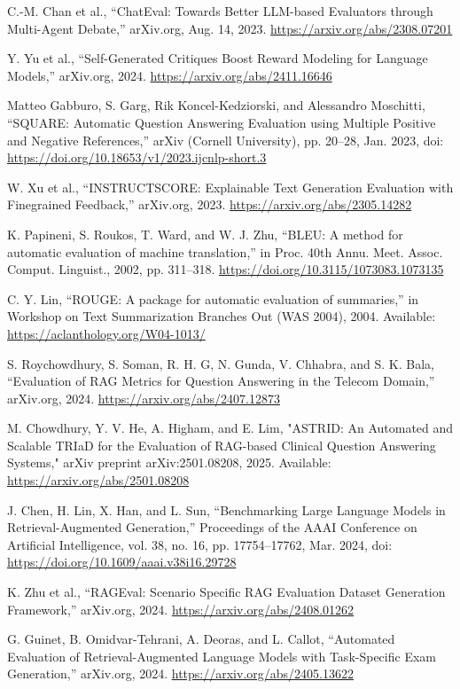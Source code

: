 \begin{thebibliography}{00}
 C.-M. Chan et al., “ChatEval: Towards Better LLM-based Evaluators through Multi-Agent Debate,” arXiv.org, Aug. 14, 2023. \url{https://arxiv.org/abs/2308.07201}

 Y. Yu et al., “Self-Generated Critiques Boost Reward Modeling for Language Models,” arXiv.org, 2024. \url{https://arxiv.org/abs/2411.16646}

 Matteo Gabburo, S. Garg, Rik Koncel-Kedziorski, and Alessandro Moschitti, “SQUARE: Automatic Question Answering Evaluation using Multiple Positive and Negative References,” arXiv (Cornell University), pp. 20–28, Jan. 2023, doi: \url{https://doi.org/10.18653/v1/2023.ijcnlp-short.3}

 W. Xu et al., “INSTRUCTSCORE: Explainable Text Generation Evaluation with Finegrained Feedback,” arXiv.org, 2023. \url{https://arxiv.org/abs/2305.14282}

 K. Papineni, S. Roukos, T. Ward, and W. J. Zhu, “BLEU: A method for automatic evaluation of machine translation,” in Proc. 40th Annu. Meet. Assoc. Comput. Linguist., 2002, pp. 311–318. \url{https://doi.org/10.3115/1073083.1073135}

 C. Y. Lin, “ROUGE: A package for automatic evaluation of summaries,” in Workshop on Text Summarization Branches Out (WAS 2004), 2004. Available: \url{https://aclanthology.org/W04-1013/}

 S. Roychowdhury, S. Soman, R. H. G, N. Gunda, V. Chhabra, and S. K. Bala, “Evaluation of RAG Metrics for Question Answering in the Telecom Domain,” arXiv.org, 2024. \url{https://arxiv.org/abs/2407.12873}

 M. Chowdhury, Y. V. He, A. Higham, and E. Lim, "ASTRID: An Automated and Scalable TRIaD for the Evaluation of RAG-based Clinical Question Answering Systems," arXiv preprint arXiv:2501.08208, 2025.  Available: \url{https://arxiv.org/abs/2501.08208}

 J. Chen, H. Lin, X. Han, and L. Sun, “Benchmarking Large Language Models in Retrieval-Augmented Generation,” Proceedings of the AAAI Conference on Artificial Intelligence, vol. 38, no. 16, pp. 17754–17762, Mar. 2024, doi: \url{https://doi.org/10.1609/aaai.v38i16.29728}

 K. Zhu et al., “RAGEval: Scenario Specific RAG Evaluation Dataset Generation Framework,” arXiv.org, 2024. \url{https://arxiv.org/abs/2408.01262}

 G. Guinet, B. Omidvar-Tehrani, A. Deoras, and L. Callot, “Automated Evaluation of Retrieval-Augmented Language Models with Task-Specific Exam Generation,” arXiv.org, 2024. \url{https://arxiv.org/abs/2405.13622}


\end{thebibliography}
